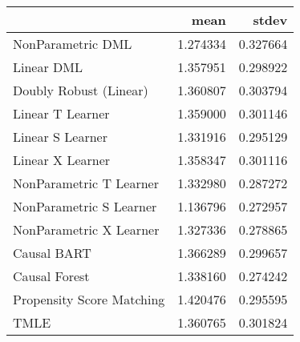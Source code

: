 \begin{tabular}{lrr}
\toprule
{} &      mean &     stdev \\
\midrule
NonParametric DML         &  1.274334 &  0.327664 \\
Linear DML                &  1.357951 &  0.298922 \\
Doubly Robust (Linear)    &  1.360807 &  0.303794 \\
Linear T Learner          &  1.359000 &  0.301146 \\
Linear S Learner          &  1.331916 &  0.295129 \\
Linear X Learner          &  1.358347 &  0.301116 \\
NonParametric T Learner   &  1.332980 &  0.287272 \\
NonParametric S Learner   &  1.136796 &  0.272957 \\
NonParametric X Learner   &  1.327336 &  0.278865 \\
Causal BART               &  1.366289 &  0.299657 \\
Causal Forest             &  1.338160 &  0.274242 \\
Propensity Score Matching &  1.420476 &  0.295595 \\
TMLE                      &  1.360765 &  0.301824 \\
\bottomrule
\end{tabular}
